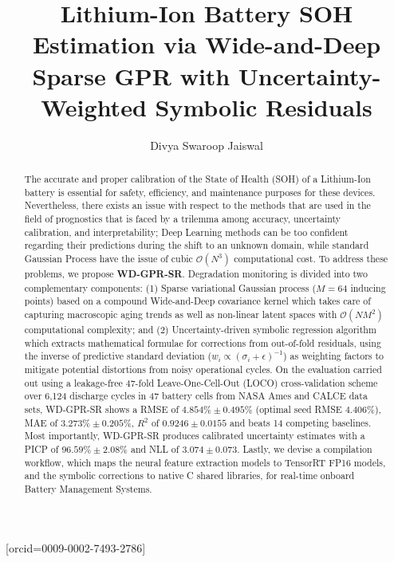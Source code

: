 \documentclass[a4paper,fleqn]{cas-sc}
\begin{document}
\let\WriteBookmarks\relax


\title[mode = title]{Lithium-Ion Battery SOH Estimation via Wide-and-Deep Sparse GPR with Uncertainty-Weighted Symbolic Residuals}

\author[1]{Divya Swaroop Jaiswal}[orcid=0009-0002-7493-2786]
\cormark[1]

\address[1]{Department of Computer Science and Engineering, Indian Institute of Technology Patna, Patna, 801106, India}


\begin{abstract}
The accurate and proper calibration of the State of Health (SOH) of a Lithium-Ion battery is essential for safety, efficiency, and maintenance purposes for these devices. Nevertheless, there exists an issue with respect to the methods that are used in the field of prognostics that is faced by a trilemma among accuracy, uncertainty calibration, and interpretability; Deep Learning methods can be too confident regarding their predictions during the shift to an unknown domain, while standard Gaussian Process have the issue of cubic $\mathcal{O}(N^3)$ computational cost. To address these problems, we propose \textbf{WD-GPR-SR}. Degradation monitoring is divided into two complementary components: (1) Sparse variational Gaussian process ($M=64$ inducing points) based on a compound Wide-and-Deep covariance kernel which takes care of capturing macroscopic aging trends as well as non-linear latent spaces with $\mathcal{O}(NM^2)$ computational complexity; and (2) Uncertainty-driven symbolic regression algorithm which extracts mathematical formulae for corrections from out-of-fold residuals, using the inverse of predictive standard deviation ($w_i \propto (\sigma_i + \epsilon)^{-1}$) as weighting factors to mitigate potential distortions from noisy operational cycles. On the evaluation carried out using a leakage-free 47-fold Leave-One-Cell-Out (LOCO) cross-validation scheme over 6,124 discharge cycles in 47 battery cells from NASA Ames and CALCE data sets, WD-GPR-SR shows a RMSE of $4.854\% \pm 0.495\%$ (optimal seed RMSE $4.406\%$), MAE of $3.273\% \pm 0.205\%$, $R^2$ of $0.9246 \pm 0.0155$ and beats 14 competing baselines. Most importantly, WD-GPR-SR produces calibrated uncertainty estimates with a PICP of $96.59\% \pm 2.08\%$ and NLL of $3.074 \pm 0.073$. Lastly, we devise a compilation workflow, which maps the neural feature extraction models to TensorRT FP16 models, and the symbolic corrections to native C shared libraries, for real-time onboard Battery Management Systems.
\end{abstract}
\end{document}
